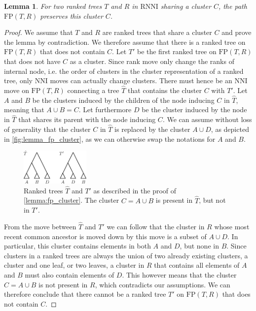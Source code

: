 \documentclass[11pt]{amsart}
\newtheorem{lemma}{Lemma}
\newcommand{\rnni}{\mathrm{RNNI}}
\newcommand{\nni}{\mathrm{NNI}}
\newcommand{\fp}{\mathrm{FP}}
\begin{document}
\begin{lemma}
	For two ranked trees $T$ and $R$ in $\rnni$ sharing a cluster $C$, the path $\fp(T,R)$ preserves this cluster $C$.
	\label{lemma:fp_cluster}
\end{lemma}

\begin{proof}
	We assume that $T$ and $R$ are ranked trees that share a cluster $C$ and prove the lemma by contradiction.
	We therefore assume that there is a ranked tree on $\fp(T,R)$ that does not contain $C$.
	Let $T'$ be the first ranked tree on $\fp(T,R)$ that does not have $C$ as a cluster.
	Since rank move only change the ranks of internal node, i.e. the order of clusters in the cluster representation of a ranked tree, only $\nni$ moves can actually change clusters.
	There must hence be an $\nni$ move on $\fp(T,R)$ connecting a tree $\hat T$ that contains the cluster $C$ with $T'$.
	Let $A$ and $B$ be the clusters induced by the children of the node inducing $C$ in $\hat T$, meaning that $A \cup B = C$.
	Let furthermore $D$ be the cluster induced by the node in $\hat T$ that shares its parent with the node inducing $C$.
	We can assume without loss of generality that the cluster $C$ in $\hat T$ is replaced by the cluster $A \cup D$, as depicted in \autoref{fig:lemma_fp_cluster}, as we can otherwise swap the notations for $A$ and $B$.

	\begin{figure}[ht]
		\includegraphics[width=0.3\textwidth]{fp_cluster.eps}
		\caption{Ranked trees $\hat T$ and $T'$ as described in the proof of \autoref{lemma:fp_cluster}.
		The cluster $C = A \cup B$ is present in $\hat T$, but not in $T'$.}
		\label{fig:lemma_fp_cluster}
	\end{figure}

	From the move between $\hat T$ and $T'$ we can follow that the cluster in $R$ whose most recent common ancestor is moved down by this move is a subset of $A \cup D$.
	In particular, this cluster contains elements in both $A$ and $D$, but none in $B$.
	Since clusters in a ranked trees are always the union of two already existing clusters, a cluster and one leaf, or two leaves, a cluster in $R$ that contains all elements of $A$ and $B$ must also contain elements of $D$.
	This however means that the cluster $C = A \cup B$ is not present in $R$, which contradicts our assumptions.
	We can therefore conclude that there cannot be a ranked tree $T'$ on $\fp(T,R)$ that does not contain $C$.
\end{proof}
\end{document}
